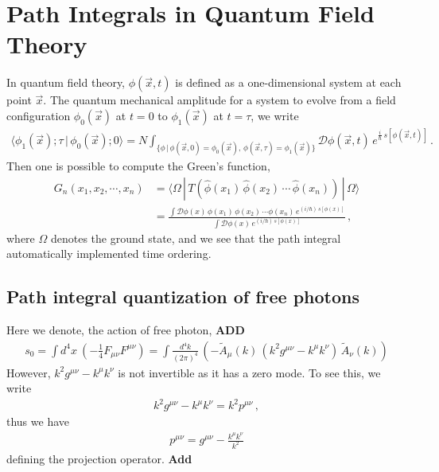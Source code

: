 \documentclass[11pt, onesided]{book}
\theoremstyle{break}
\theoremstyle{break}
\newcommand{\that}[1]{\widetilde{#1}}
\begin{document}
\section[Path Integrals in Quantum Field Theory]{\color{red}Path Integrals in Quantum Field Theory\color{black}}
In quantum field theory, $\phi(\vec{x},t)$ is defined as a one-dimensional system at each point $\vec{x}$. The quantum mechanical amplitude for a system to evolve from a field configuration $\phi_0(\vec{x})$ at $t = 0$ to $\phi_1(\vec{x})$ at $t = \tau$, we write
\begin{align*}
\langle \phi_1(\vec{x}); \tau\,|\, \phi_0(\vec{x}); 0\rangle = 
N \int_{\{\phi\, | \, \phi(\vec{x},0) = \phi_0(\vec{x}),\, \phi(\vec{x},\tau) = \phi_1(\vec{x})\}} \mathcal{D}\phi(\vec{x},t) \, e^{\frac{i}{\hbar}\, s[\phi(\vec{x},t)]}\,.
\end{align*}
Then one is possible to compute the Green's function,
\begin{align*}
G_n(x_1,x_2,\cdots, x_n)&= \langle \Omega \, | \,T(\hat{\phi}(x_1) \, \hat{\phi}(x_2) \, \cdots \, \hat{\phi}(x_n))\, |\, \Omega\rangle\\
&= \frac{\int \mathcal{D}\phi(x) \, \phi(x_1) \, \phi(x_2)\, \cdots \phi(x_n) \, e^{(i/\hbar)\, s[\phi(x)]}}{\int \mathcal{D}\phi(x)\, e^{(i/\hbar)\, s[\phi(x)]}}
\,,
\end{align*}
where $\Omega$ denotes the ground state, and we see that the path integral automatically implemented time ordering.\\

\subsection*{Path integral quantization of free photons}
Here we denote, the action of free photon, \textbf{ADD}
\begin{align*}
s_0 = \int d^4 x\ \left( -\frac{1}{4}F_{\mu\nu}F^{\mu\nu}\right) = \int \frac{d^4k}{(2\pi)^4}\, \left( - \that{A}_\mu(k) \, (k^2 g^{\mu\nu} - k^\mu k^\nu)\,\that{A}_\nu(k)\right)
\end{align*}
However, $k^2g^{\mu\nu} - k^\mu k^\nu$ is not invertible as it has a zero mode. To see this, we write
\begin{align*}
k^2 g^{\mu\nu} - k^\mu k^\nu = k^2 p^{\mu\nu}\,,
\end{align*}
thus we have
\begin{align*}
p^{\mu\nu}  = g^{\mu\nu} - \frac{k^\mu k^\nu}{k^2}
\end{align*}
defining the projection operator. \textbf{Add}\\
\end{document}
